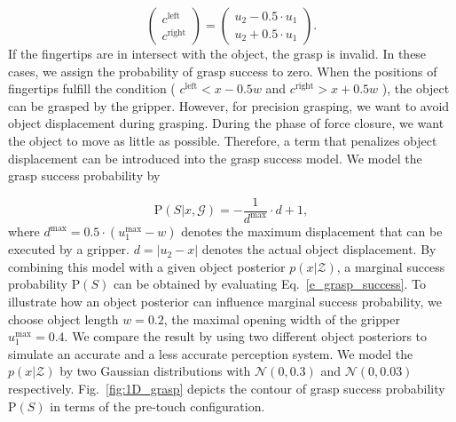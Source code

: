 \begin{equation}
\begin{pmatrix}
c^{\text{left}}\\ 
c^{\text{right}}
\end{pmatrix}
=\begin{pmatrix}
u_2 - 0.5 \cdot u_1\\ 
u_2 + 0.5 \cdot u_1
\end{pmatrix}.
\end{equation}
If the fingertips are in intersect with the object, the grasp is invalid. In these cases, we assign the probability of grasp success to zero. When the positions of fingertips fulfill the condition ( $c^{\text{left}} < x - 0.5w$ and $c^{\text{right}} > x + 0.5w$ ), the object can be grasped by the gripper. However, for precision grasping, we want to avoid object displacement during grasping. During the phase of force closure, we want the object to move as little as possible. Therefore, a term that penalizes object displacement can be introduced into the grasp success model. We model the grasp success probability by 

\begin{equation}
  \text{P}(S | x,  \mathcal{G} )  = -\frac{1}{ d^{\text{max}} } \cdot d + 1,
  \label{equ:5}
\end{equation}
where $d^{\text{max}}  = 0.5 \cdot (u_{1}^{\text{max}} - w) $ denotes the maximum displacement that can be executed by a gripper. $d = | u_2 - x | $ denotes the actual object displacement. By combining this model with a given object posterior $p(x|\mathcal{Z})$, a marginal success probability $\text{P}(S)$ can be obtained by evaluating Eq.~\ref{e_grasp_success}. To illustrate how an object posterior can influence marginal success probability, we choose object length $w = 0.2$, the maximal opening width of the gripper $u_{1}^{\text{max}} = 0.4 $. We compare the result by using two different object posteriors to simulate an accurate and a less accurate perception system. We model the $p(x|\mathcal{Z})$ by two Gaussian distributions with $\mathcal{N}(0, 0.3)$ and $\mathcal{N}(0, 0.03)$ respectively. Fig.~\ref{fig:1D_grasp} depicts the contour of grasp success probability $\text{P}(S)$ in terms of the pre-touch configuration.

